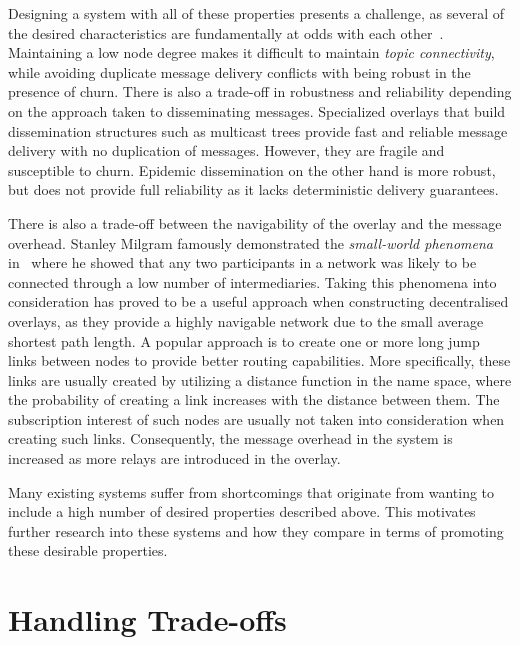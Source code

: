 Designing a system with all of these properties
presents a challenge, as several of the desired characteristics are
fundamentally at odds with each other~\cite{Kermarrec:2013, Setty:2012}. Maintaining a low node degree
makes it difficult to maintain \emph{topic connectivity}, while
avoiding duplicate message delivery conflicts with being robust in the
presence of churn. There is also a trade-off in robustness and
reliability depending on the approach taken to disseminating messages.
Specialized overlays that build dissemination structures such as
multicast trees provide fast and reliable message delivery with no
duplication of messages. However, they are fragile and susceptible to
churn. Epidemic dissemination on the other hand is more robust, but does
not provide full reliability as it lacks deterministic delivery
guarantees.

There is also a trade-off between the navigability of the overlay and
the message overhead. Stanley Milgram famously demonstrated the
\emph{small-world phenomena} in~\cite{milgram1967small} where he showed
that any two participants in a network was likely to be connected
through a low number of intermediaries. Taking this phenomena into
consideration has proved to be a useful approach when constructing
decentralised overlays, as they provide a highly navigable network due
to the small average shortest path length. A popular approach is to
create one or more long jump links between nodes to provide better
routing capabilities. More specifically, these links are usually created
by utilizing a distance function in the name space, where the
probability of creating a link increases with the distance between them.
The subscription interest of such nodes are usually not taken into
consideration when creating such links. Consequently, the message
overhead in the system is increased as more relays are introduced in the
overlay.

Many existing systems suffer from shortcomings that originate from wanting
to include a high number of desired properties described above. This
motivates further research into these systems and how they compare in
terms of promoting these desirable properties.

\section{Handling Trade-offs}

